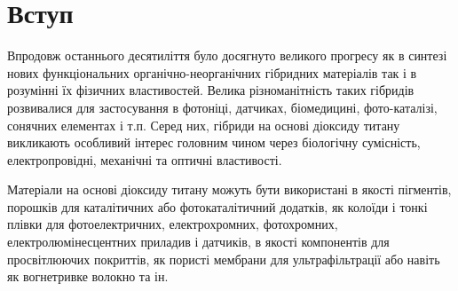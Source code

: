 
\newpage
\chapter*{Вступ}

Впродовж останнього десятиліття було досягнуто великого прогресу як в синтезі нових функціональних органічно-неорганічних гібридних матеріалів так і в розумінні їх фізичних властивостей. Велика різноманітність таких гібридів розвивалися для застосування в фотоніці, датчиках, біомедицині, фото-каталізі, сонячних елементах і т.п. Серед них, гібриди на основі діоксиду титану викликають особливий інтерес головним чином через біологічну сумісність, електропровідні, механічні та оптичні властивості.

Матеріали на основі діоксиду титану можуть бути використані в якості пігментів, порошків для каталітичних або фотокаталітичний додатків, як колоїди і тонкі плівки для фотоелектричних, електрохромних, фотохромних, електролюмінесцентних приладив і датчиків, в якості компонентів для просвітлюючих покриттів, як пористі мембрани для ультрафільтрації або навіть як вогнетривке волокно та ін.

\clearpage
